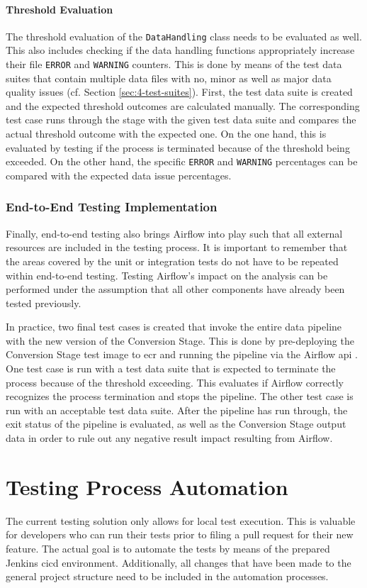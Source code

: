 \paragraph{Threshold Evaluation} The threshold evaluation of the \texttt{DataHandling} class needs to be evaluated as well. This also includes checking if the data handling functions appropriately increase their file \texttt{ERROR} and \texttt{WARNING} counters. This is done by means of the test data suites that contain multiple data files with no, minor as well as major data quality issues (cf. Section \ref{sec:4-test-suites}). First, the test data suite is created and the expected threshold outcomes are calculated manually. The corresponding test case runs through the stage with the given test data suite and compares the actual threshold outcome with the expected one. On the one hand, this is evaluated by testing if the process is terminated because of the threshold being exceeded. On the other hand, the specific \texttt{ERROR} and \texttt{WARNING} percentages can be compared with the expected data issue percentages.

\subsubsection{End-to-End Testing Implementation}
Finally, end-to-end testing also brings Airflow into play such that all external resources are included in the testing process. It is important to remember that the areas covered by the unit or integration tests do not have to be repeated within end-to-end testing. Testing Airflow's impact on the analysis can be performed under the assumption that all other components have already been tested previously.

In practice, two final test cases is created that invoke the entire data pipeline with the new version of the Conversion Stage. This is done by pre-deploying the Conversion Stage test image to \ac{ecr} and running the pipeline via the Airflow \acs{api} \cite{airflow}. One test case is run with a test data suite that is expected to terminate the process because of the threshold exceeding. This evaluates if Airflow correctly recognizes the process termination and stops the pipeline. The other test case is run with an acceptable test data suite. After the pipeline has run through, the exit status of the pipeline is evaluated, as well as the Conversion Stage output data in order to rule out any negative result impact resulting from Airflow. 

\section{Testing Process Automation}
The current testing solution only allows for local test execution. This is valuable for developers who can run their tests prior to filing a pull request for their new feature. The actual goal is to automate the tests by means of the prepared Jenkins \ac{cicd} environment. Additionally, all changes that have been made to the general project structure need to be included in the automation processes.

